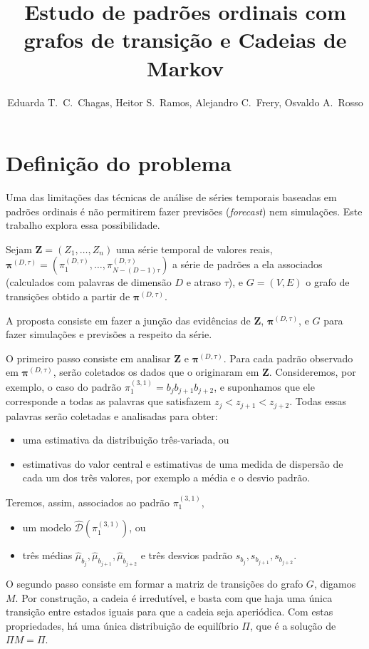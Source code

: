 \documentclass[10pt]{article}
\title{Estudo de padrões ordinais com grafos de transição e Cadeias de Markov}
\author{
	Eduarda T.\ C.\ Chagas\inst{1},
	Heitor S.\ Ramos\inst{1},
	Alejandro C.\ Frery,
	Osvaldo A.\ Rosso
}
\begin{document}
\maketitle

\section*{\centering Definição do problema} \label{abstract}

Uma das limitações das técnicas de análise de séries temporais baseadas em padrões ordinais é não permitirem fazer previsões (\textit{forecast}) nem simulações.
Este trabalho explora essa possibilidade.

Sejam $\bm Z=(Z_1,\dots,Z_n)$ uma série temporal de valores reais,
$\bm \pi^{(D,\tau)} = (\pi^{(D,\tau)}_1,\dots,\pi^{(D,\tau)}_{N-(D-1)\tau})$ a série de padrões a ela associados (calculados com palavras de dimensão $D$ e atraso $\tau$),
e $G=(V,E)$ o grafo de transições obtido a partir de $\bm \pi^{(D,\tau)}$.

A proposta consiste em fazer a junção das evidências de $\bm Z$, $\bm \pi^{(D,\tau)}$, e $G$ para fazer simulações e previsões a respeito da série.

O primeiro passo consiste em analisar $\bm Z$ e $\bm \pi^{(D,\tau)}$.
Para cada padrão observado em $\bm \pi^{(D,\tau)}$, serão coletados os dados que o originaram em $\bm Z$.
Consideremos, por exemplo, o caso do padrão $\pi^{(3,1)}_1=b_{j}b_{j+1}b_{j+2}$, e suponhamos que ele corresponde a todas as palavras que satisfazem $z_{j}<z_{j+1}<z_{j+2}$.
Todas essas palavras serão coletadas e analisadas para obter:
\begin{itemize}
	\item uma estimativa da distribuição três-variada, ou
	\item estimativas do valor central e estimativas de uma medida de dispersão de cada um dos três valores, por exemplo a média e o desvio padrão.
\end{itemize} 
Teremos, assim, associados ao padrão $\pi^{(3,1)}_1$, 
\begin{itemize}
	\item um modelo $\widehat{\mathcal{D}}(\pi^{(3,1)}_1)$, ou
	\item três médias $\widehat\mu_{b_j}, \widehat\mu_{b_{j+1}}, \widehat\mu_{b_{j+2}}$ e três desvios padrão $s_{b_j}, s_{b_{j+1}}, s_{b_{j+2}}$.
\end{itemize} 

O segundo passo consiste em formar a matriz de transições do grafo $G$, digamos $M$.
Por construção, a cadeia é irredutível, e basta com que haja uma única transição entre estados iguais para que a cadeia seja aperiódica.
Com estas propriedades, há uma única distribuição de equilíbrio $\Pi$, que é a solução de $\Pi M=\Pi$.
\end{document}
